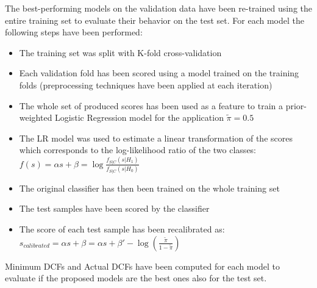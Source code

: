 \documentclass[12pt,a4paper]{article}
\begin{document}
The best-performing models on the validation data have been re-trained using the entire training set to evaluate their behavior on the test set.
For each model the following steps have been performed:
\begin{itemize}
    \item The training set was split with K-fold cross-validation
    \item Each validation fold has been scored using a model trained on the training folds (preprocessing techniques have been applied at each iteration)
    \item The whole set of produced scores has been used as a feature to train a prior-weighted Logistic Regression model for the application $\tilde{\pi} = 0.5$
    \item The LR model was used to estimate a linear transformation of the scores which corresponds to the log-likelihood ratio of the two classes:
          $ f(s) = \alpha s + \beta = \log{\frac{f_{S|C}(s|H_1)}{f_{S|C}(s|H_0)}}$
    \item The original classifier has then been trained on the whole training set
    \item The test samples have been scored by the classifier
    \item The score of each test sample has been recalibrated as:\\ $s_{calibrated} = \alpha s + \beta = \alpha s + \beta' - \log{(\frac{\tilde{\pi}}{1-\tilde{\pi}})}$
\end{itemize}

Minimum DCFs and Actual DCFs have been computed for each model to evaluate if the proposed models are the best ones also for the test set. \\
\end{document}
